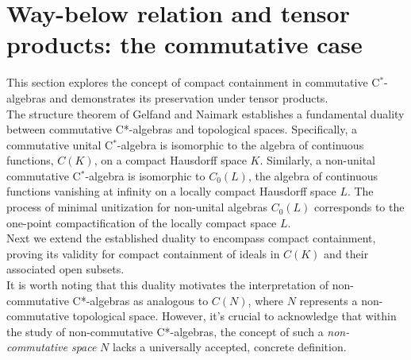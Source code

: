 \documentclass{iopconfser}
\theoremstyle{definition}
\begin{document}
\section{Way-below relation and tensor products: the commutative case}

This section explores the concept of compact containment in commutative C$^*$-algebras and demonstrates its preservation under tensor products.\\

The structure theorem of Gelfand and Naimark establishes a fundamental duality between commutative C*-algebras and topological spaces. Specifically, a commutative unital C$^*$-algebra is isomorphic to the algebra of continuous functions, $C(K)$, on a compact Hausdorff space $K$. Similarly, a non-unital commutative C$^*$-algebra is isomorphic to $C_0(L)$, the algebra of continuous functions vanishing at infinity on a locally compact Hausdorff space $L$. The process of minimal unitization for non-unital algebras $C_0(L)$ corresponds to the one-point compactification of the locally compact space $L$.\\

Next we extend the established duality to encompass compact containment, proving its validity for compact containment of ideals in $C(K)$ and their associated open subsets.\\

It is worth noting that this duality motivates the interpretation of non-commutative C*-algebras as analogous to $C(N)$, where $N$ represents a non-commutative topological space. However, it's crucial to acknowledge that within the study of non-commutative C*-algebras, the concept of such a \textit{non-commutative space} $N$ lacks a universally accepted, concrete definition.\\
\end{document}
